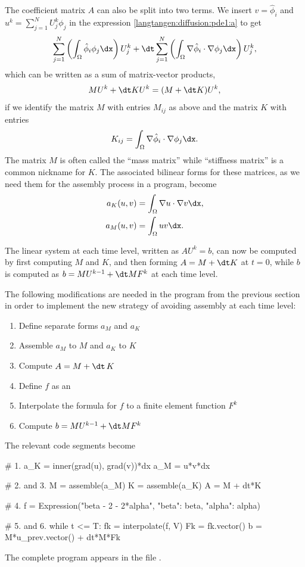 The coefficient matrix $A$ can also be split into two terms.
We insert $v=\hat\phi_i$ and $u^k = \sum_{j=1}^N U^k_j\phi_j$ in
the expression \eqref{langtangen:diffusion:pde1:a} to get
\begin{equation}
 \sum_{j=1}^N \left(\int_\Omega \hat\phi_i\phi_j\dx\right)U^k_j
+ {\dt} \sum_{j=1}^N \left(\int_\Omega \nabla\hat\phi_i\cdot\nabla\phi_j\dx\right)U^k_j,
\end{equation}
which can be written as a sum of matrix-vector products,
\begin{equation}
 MU^k + {\dt} KU^k = (M + {\dt} K)U^k,
\end{equation}
if we identify the matrix $M$ with entries $M_{ij}$ as above and
the matrix $K$ with entries
\begin{equation}
  K_{ij} = \int_\Omega \nabla\hat\phi_i\cdot\nabla\phi_j\dx.
\end{equation}
The matrix $M$ is often called the ``mass matrix'' while ``stiffness
matrix'' is a common nickname for $K$. The associated bilinear forms for
these matrices, as we need them for the assembly process in a \fenics{}
program, become
\begin{align}
  a_K(u,v) &= \int_\Omega\nabla u\cdot\nabla v\dx,
\label{langtangen:diffusion:pde1:aK}
\\
  a_M(u,v) &= \int_\Omega uv\dx.
\label{langtangen:diffusion:pde1:aM}
\end{align}

The linear system at each time level, written as $AU^k=b$, can now be
computed by first computing $M$ and $K$, and then forming $A=M+{\dt}
K$ at $t=0$, while $b$ is computed as $b=MU^{k-1} + {\dt}MF^k$ at each
time level.

The following modifications are needed in the 
program from the previous section in order to implement the new strategy
of avoiding assembly at each time level:
\begin{enumerate}
\item Define separate forms $a_M$ and $a_K$
\item Assemble $a_M$ to $M$ and $a_K$ to $K$
\item Compute $A=M+{\dt}\, K$
\item Define $f$ as an 
\item Interpolate the formula for $f$ to a finite element function $F^k$
\item Compute $b=MU^{k-1} + {\dt}MF^k$
\end{enumerate}
The relevant code segments become
\begin{python}
# 1.
a_K = inner(grad(u), grad(v))*dx
a_M = u*v*dx

# 2. and 3.
M = assemble(a_M)
K = assemble(a_K)
A = M + dt*K

# 4.
f = Expression("beta - 2 - 2*alpha", {"beta": beta, "alpha": alpha})

# 5. and 6.
while t <= T:
    fk = interpolate(f, V)
    Fk = fk.vector()
    b = M*u_prev.vector() + dt*M*Fk
\end{python}
The complete program appears in the file .

